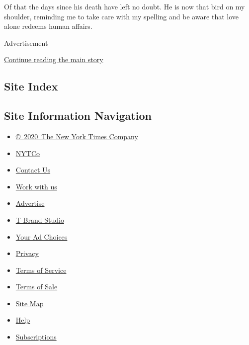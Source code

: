 Of that the days since his death have left no doubt. He is now that bird
on my shoulder, reminding me to take care with my spelling and be aware
that love alone redeems human affairs.

Advertisement

\protect\hyperlink{after-bottom}{Continue reading the main story}

\hypertarget{site-index}{%
\subsection{Site Index}\label{site-index}}

\hypertarget{site-information-navigation}{%
\subsection{Site Information
Navigation}\label{site-information-navigation}}

\begin{itemize}
\tightlist
\item
  \href{https://help.nytimes3xbfgragh.onion/hc/en-us/articles/115014792127-Copyright-notice}{©~2020~The
  New York Times Company}
\end{itemize}

\begin{itemize}
\tightlist
\item
  \href{https://www.nytco.com/}{NYTCo}
\item
  \href{https://help.nytimes3xbfgragh.onion/hc/en-us/articles/115015385887-Contact-Us}{Contact
  Us}
\item
  \href{https://www.nytco.com/careers/}{Work with us}
\item
  \href{https://nytmediakit.com/}{Advertise}
\item
  \href{http://www.tbrandstudio.com/}{T Brand Studio}
\item
  \href{https://www.nytimes3xbfgragh.onion/privacy/cookie-policy\#how-do-i-manage-trackers}{Your
  Ad Choices}
\item
  \href{https://www.nytimes3xbfgragh.onion/privacy}{Privacy}
\item
  \href{https://help.nytimes3xbfgragh.onion/hc/en-us/articles/115014893428-Terms-of-service}{Terms
  of Service}
\item
  \href{https://help.nytimes3xbfgragh.onion/hc/en-us/articles/115014893968-Terms-of-sale}{Terms
  of Sale}
\item
  \href{https://spiderbites.nytimes3xbfgragh.onion}{Site Map}
\item
  \href{https://help.nytimes3xbfgragh.onion/hc/en-us}{Help}
\item
  \href{https://www.nytimes3xbfgragh.onion/subscription?campaignId=37WXW}{Subscriptions}
\end{itemize}
